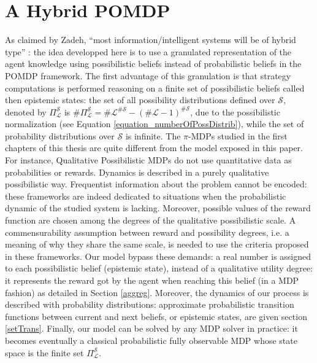 \section{A Hybrid POMDP}
As claimed by Zadeh, ``most information/intelligent
systems will be of hybrid type'' \cite{DBLP:journals/soco/Zadeh98}:
the idea developped here is to use a granulated representation of the agent knowledge 
using possibilistic beliefs instead of probabilistic beliefs
in the POMDP framework.
The first advantage of this granulation
is that strategy computations
is performed reasoning on
a finite set of possibilistic beliefs 
called then epistemic states:
the set of all possibility distributions 
defined over $\mathcal{S}$, denoted by $\Pi^{\mathcal{S}}_{\mathcal{L}}$ is
$\# \Pi^{\mathcal{S}}_{\mathcal{L}} = \# \mathcal{L}^{\# \mathcal{S}} - (\# \mathcal{L}-1)^{\# \mathcal{S}}$,
due to the possibilistic normalization (see Equation \ref{equation_numberOfPossDistrib}),
while the set of probability distributions over $\mathcal{S}$ is infinite.
The $\pi$-MDPs studied in the first chapters of this thesis 
are quite different from the model exposed in this paper. 
For instance, Qualitative Possibilistic MDPs 
do not use quantitative data as probabilities or rewards. 
Dynamics is described in a purely qualitative possibilistic way. 
Frequentist information about the problem cannot be encoded: 
these frameworks are indeed dedicated to situations 
when the probabilistic dynamic of the studied system is lacking.
Moreover, possible values of the reward function are chosen 
among the degrees of the qualitative possibilistic scale.
A commensurability assumption between reward and possibility 
degrees, i.e. a meaning of why they share the same scale, 
is needed to use the criteria proposed in these frameworks.
Our model bypass these demands: a real number is assigned 
to each possibilistic belief (epistemic state), 
instead of a qualitative utility degree: 
it represents the reward got by the agent 
when reaching this belief (in a MDP fashion)
as detailed in Section \ref{aggreg}. 
Moreover, the dynamics of our process 
is described with probability distributions: 
approximate probabilistic transition functions 
between current and next beliefs, or epistemic states, 
are given section \ref{setTrans}.
Finally, our model can be solved by any MDP solver in practice: 
it becomes eventually a classical probabilistic fully observable MDP
whose state space is the finite set $\Pi^{\mathcal{S}}_{\mathcal{L}}$. 

